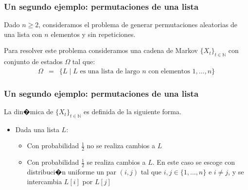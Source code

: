 \documentclass{beamer}
\newcommand{\vs}[1]{\vspace{#1mm}}
\begin{document}
	\begin{frame}
		\frametitle{Un segundo ejemplo: permutaciones de una lista}
		
		{\small
			
			Dado $n \geq 2$, consideramos el problema de generar permutaciones aleatorias de una lista con $n$ elementos y sin repeticiones.
			
			\vs{10}
			
			Para resolver este problema consideramos una cadena de Markov $\{ X_t \}_{t \in \mathbb{N}}$ con conjunto de estados $\Omega$ tal que:
			\begin{eqnarray*}
				\Omega & = & \{ L \mid L \text{ es una lista de largo } n \text{ con elementos } 1, \ldots, n\}
			\end{eqnarray*}
			
		}
		
	\end{frame}
	
	
	\begin{frame}
		\frametitle{Un segundo ejemplo: permutaciones de una lista}
		
		{\small
			
			La din�mica de $\{ X_t \}_{t \in \mathbb{N}}$  es definida de la siguiente forma.
			\vs{2}
			\begin{itemize}
				\item Dada una lista $L$:
				\vs{2}
				\begin{itemize}
					\item Con probabilidad $\frac{1}{2}$ no se realiza cambios a $L$
					\vs{3}
					
					\item Con probabilidad $\frac{1}{2}$ se realiza cambios a $L$. En este caso se escoge con distribuci�n uniforme un par $(i,j)$ tal que $i,j \in \{1,\ldots, n\}$ e $i \neq j$, y se intercambia $L[i]$ por $L[j]$
				\end{itemize}
			\end{itemize}
			
			
		}
		
	\end{frame}
	
\end{document}
